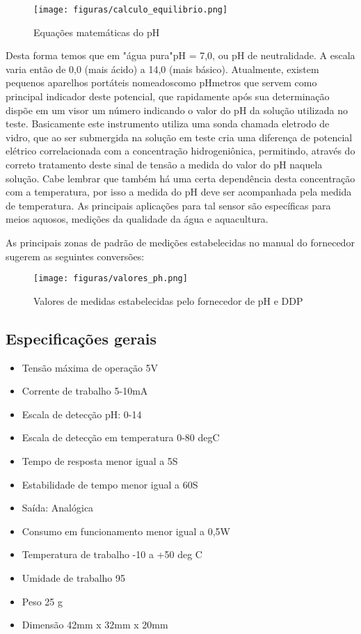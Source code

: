 \begin{figure}[H]
	\centering
	\texttt{[image: figuras/calculo\_equilibrio.png]}
	\caption{Equações matemáticas do pH}
	\label{calculo_equilibrio}
\end{figure}

Desta forma temos que em "água pura"pH = 7,0, ou pH de neutralidade. A escala varia
então de 0,0 (mais ácido) a 14,0 (mais básico). Atualmente, existem pequenos aparelhos portáteis
nomeadoscomo pHmetros que servem como principal indicador deste potencial, que rapidamente
após sua determinação dispõe em um visor um número indicando o valor do pH da solução
utilizada no teste. Basicamente este instrumento utiliza uma sonda chamada eletrodo de vidro, que
ao ser submergida na solução em teste cria uma diferença de potencial elétrico correlacionada com
a concentração hidrogeniônica, permitindo, através do correto tratamento deste sinal de tensão a
medida do valor do pH naquela solução. Cabe lembrar que também há uma certa dependência
desta concentração com a temperatura, por isso a medida do pH deve ser acompanhada pela
medida de temperatura.
As principais aplicações para tal sensor são específicas para meios aquosos, medições da
qualidade da água e aquacultura. 

As principais zonas de padrão de medições estabelecidas no
manual do fornecedor sugerem as seguintes conversões:

\begin{figure}[H]
	\centering
	\texttt{[image: figuras/valores\_ph.png]}
	\caption{Valores de medidas estabelecidas pelo fornecedor de pH e DDP}
	\label{valores_ph}
\end{figure}

\subsection{Especificações gerais}

\begin{itemize}
	\item Tensão máxima de operação 5V
	\item Corrente de trabalho 5-10mA
	\item Escala de detecção pH: 0-14
	\item Escala de detecção em temperatura 0-80 degC
	\item Tempo de resposta menor igual a 5S
	\item Estabilidade de tempo menor igual a 60S
	\item Saída: Analógica
	\item Consumo em funcionamento menor igual a 0,5W
	\item Temperatura de trabalho -10 a +50 deg C
	\item Umidade de trabalho 95 %
	\item Peso 25 g
	\item Dimensão 42mm x 32mm x 20mm
\end{itemize}

